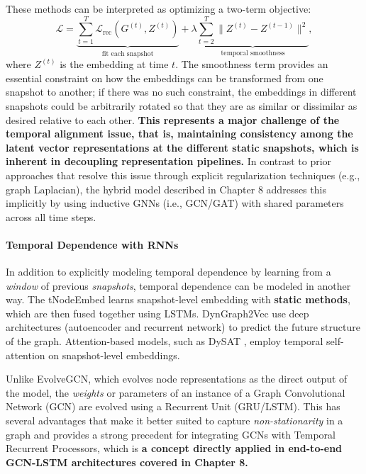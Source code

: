 These methods can be interpreted as optimizing a two-term objective:
\[
\mathcal{L} = \underbrace{\sum_{t=1}^{T} \mathcal{L}_{\text{rec}}(G^{(t)}, Z^{(t)})}_{\text{fit each snapshot}}
+ \lambda \underbrace{\sum_{t=2}^{T}\|Z^{(t)}-Z^{(t-1)}\|^2}_{\text{temporal smoothness}},
\]
where $Z^{(t)}$ is the embedding at time $t$. The smoothness term provides an essential constraint on how the embeddings can be transformed from one snapshot to another; if there was no such constraint, the embeddings in different snapshots could be arbitrarily rotated so that they are as similar or dissimilar as desired relative to each other. 
\textbf{This represents a major challenge of the temporal alignment issue, that is, maintaining consistency among the latent vector representations at the different static snapshots, which is inherent in decoupling representation pipelines.} In contrast to prior approaches that resolve this issue through explicit regularization techniques (e.g., graph Laplacian), the hybrid model described in Chapter 8 addresses this implicitly by using inductive \acp{GNN} (i.e., \ac{GCN}/\ac{GAT}) with shared parameters across all time steps.

\paragraph{Temporal Dependence with RNNs }

In addition to explicitly modeling temporal dependence by learning from a \emph{window} of previous \emph{snapshots}, temporal dependence can be modeled in another way. 
The tNodeEmbed \cite{singer2019tnodeembed} learns snapshot-level embedding with \textbf{static methods}, which are then fused together using \acp{LSTM}. 
DynGraph2Vec \cite{goyal2019dyngraph2vec} use deep architectures (autoencoder and recurrent network) to predict the future structure of the graph.
Attention-based models, such as DySAT \cite{sankar2020dysat}, employ temporal self-attention on snapshot-level embeddings.

Unlike EvolveGCN, which evolves node representations as the direct output of the model, the \emph{weights} or parameters of an instance of a Graph Convolutional Network (\acs{GCN}) are evolved using a Recurrent Unit (\ac{GRU}/\ac{LSTM}). This has several advantages that make it better suited to capture \emph{non-stationarity} in a graph and provides a strong precedent for integrating \acp{GCN} with Temporal Recurrent Processors, which is \textbf{a concept directly applied in end-to-end \acs{GCN}-\acs{LSTM} architectures covered in Chapter 8.}

